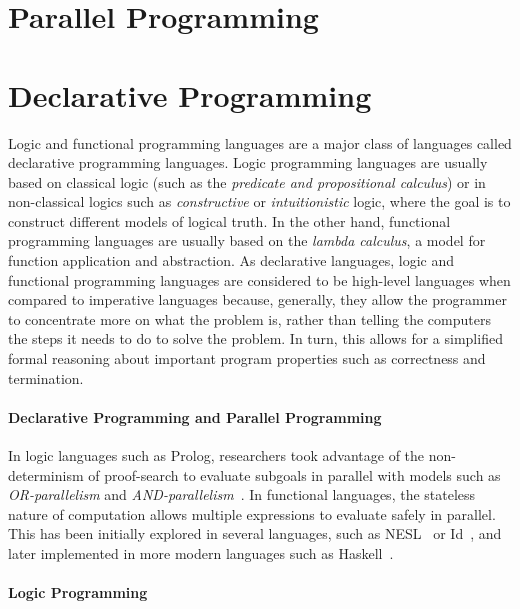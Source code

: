 \section{Parallel Programming}

\section{Declarative Programming}

Logic and functional programming languages are a major class of languages called
declarative programming languages. Logic programming languages are usually based
on classical logic (such as the \emph{predicate and propositional calculus}) or
in non-classical logics such as \emph{constructive} or \emph{intuitionistic}
logic, where the goal is to construct different models of logical truth.  In the
other hand, functional programming languages are usually based on the
\emph{lambda calculus}, a model for function application and abstraction. As
declarative languages, logic and functional programming languages are considered
to be high-level languages when compared to imperative languages because,
generally, they allow the programmer to concentrate more on what the problem is,
rather than telling the computers the steps it needs to do to solve the problem.
In turn, this allows for a simplified formal reasoning about important program
properties such as correctness and termination.

\paragraph{Declarative Programming and Parallel Programming}

In logic languages such as Prolog, researchers took advantage of the
non-determinism of proof-search to evaluate subgoals in parallel with models
such as \emph{OR-parallelism} and
\emph{AND-parallelism}~\cite{Gupta:2001:PEP:504083.504085}.  In functional
languages, the stateless nature of computation allows multiple expressions to
evaluate safely in parallel.  This has been initially explored in several
languages, such as NESL~\cite{Blelloch:1996:PPA:227234.227246} or
Id~\cite{Nikhil93anoverview}, and later implemented in more modern languages
such as Haskell~\cite{Chakravarty07dataparallel}.

\paragraph{Logic Programming}

